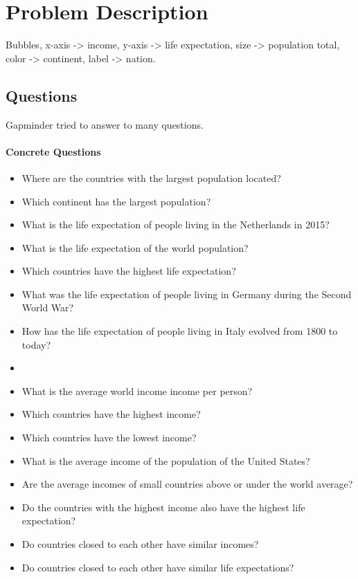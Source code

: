 \section{Problem Description}
\label{sec:problem}

Bubbles, x-axis -> income, y-axis -> life expectation, size -> population total, color -> continent, label -> nation.

\subsection{Questions}
Gapminder tried to answer to many questions.

\paragraph{Concrete Questions}
\begin{itemize}

    \item Where are the countries with the largest population located?
    \item Which continent has the largest population?

    \item What is the life expectation of people living in the Netherlands in 2015?    
    \item What is the life expectation of the world population?
    \item Which countries have the highest life expectation?
    \item What was the life expectation of people living in Germany during the Second World War?
    \item How has the life expectation of people living in Italy evolved from 1800 to today?    
    \item 

    \item What is the average world income income per person?
    \item Which countries have the highest income?
    \item Which countries have the lowest income?
    \item What is the average income of the population of the United States?
    \item Are the average incomes of small countries above or under the world average?

    \item Do the countries with the highest income also have the highest life expectation?
    \item Do countries closed to each other have similar incomes?
    \item Do countries closed to each other have similar life expectations?

\end{itemize}

